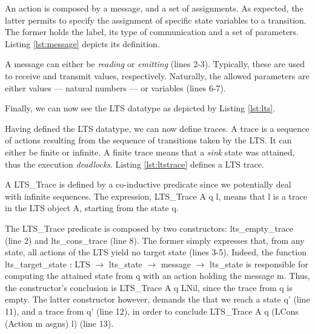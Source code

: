 	\noindent An \textsf{action} is composed by a \textsf{message}, and a set of \textsf{assignments}.
	As expected, the latter permits to specify the assignment of specific state variables to a \textsf{transition}.
	The former holds the label, its type of communication and a set of parameters. Listing \ref{lst:message}
	depicts its definition.
	
				

	\noindent A message can either be \textit{reading} or \textit{emitting} (lines 2-3). Typically, these
	are used to receive and transmit values, respectively. Naturally, the allowed \textsf{parameters} are
	either values --- natural numbers --- or variables (lines 6-7).
	
	
	Finally, we can now see the \textsf{LTS} datatype as depicted by Listing \ref{lst:lts}.	
		
		

	Having defined the \textsf{LTS} datatype, we can now define \textsf{traces}. A trace is a sequence of actions 
	resulting from the sequence of \textsf{transitions} taken by the \textsf{LTS}. It can either be finite or
	infinite. A finite trace means that a \textit{sink} state was attained, thus the execution \textit{deadlocks}.
	Listing \ref{lst:ltstrace} defines a \textsf{LTS} trace.	
	
	
			


	\noindent A \textsf{LTS\_Trace} is defined by a co-inductive predicate since we potentially deal
	with infinite sequences. The expression, \textsf{LTS\_Trace A q l}, means that \textsf{l} is a trace
	in the \textsf{LTS} object \textsf{A}, starting from the state \textsf{q}.   

		The \textsf{LTS\_Trace} predicate is composed by two constructors: \textsf{lts\_empty\_trace} (line 2)
	and \textsf{lts\_cons\_trace} (line 8).  The former simply expresses that, from any state, 
	all \textsf{actions} of the \textsf{LTS} yield no target state (lines 3-5). Indeed, the
	function 
	\textsf{lts\_target\_state : LTS $\rightarrow$ lts\_state $\rightarrow$ message $\rightarrow$ lts\_state}
	is responsible for computing the attained state from \textsf{q} with an \textsf{action} holding the message
	\textsf{m}. Thus, the constructor's conclusion is \textsf{LTS\_Trace A q LNil}, since the trace from \textsf{q}
	is empty.	The latter constructor however, demands the that we reach a state \textsf{q'} (line 11), and
	a trace from \textsf{q'} (line 12), in order to conclude \textsf{LTS\_Trace A q (LCons (Action m asgns) l)} (line 13).
	
